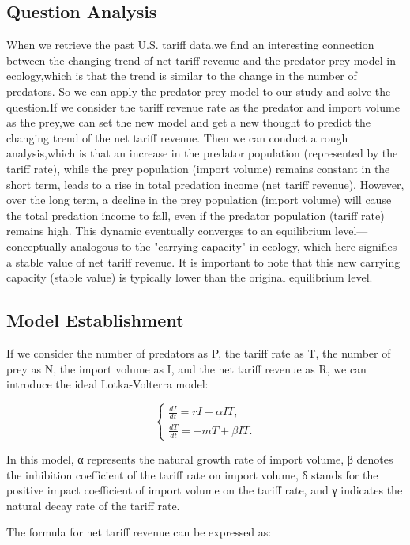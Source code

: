 \documentclass{apmcmthesis}
\begin{document}
\subsection{Question Analysis}
When we retrieve the past U.S. tariff data,we find an interesting connection between the changing trend of net tariff revenue and the predator-prey model in ecology,which is that the trend is similar to the change in the number of predators.
So we can apply the predator-prey model to our study and solve the question.If we consider the tariff revenue rate as the predator and import volume as the prey,we can set the new model and get a new thought to predict the changing trend of the net tariff revenue.
Then we can conduct a rough analysis,which is that an increase in the predator population (represented by the tariff rate), while the prey population (import volume) remains constant in the short term, leads to a rise in total predation income (net tariff revenue). However, over the long term, a decline in the prey population (import volume) will cause the total predation income to fall, even if the predator population (tariff rate) remains high. This dynamic eventually converges to an equilibrium level—conceptually analogous to the "carrying capacity" in ecology, which here signifies a stable value of net tariff revenue. It is important to note that this new carrying capacity (stable value) is typically lower than the original equilibrium level.


\subsection{Model Establishment}
If we consider the number of predators as P, the tariff rate as T, the number of prey as N, the import volume as I, and the net tariff revenue as R, we can introduce the ideal Lotka-Volterra model:

\[
\begin{cases}
\displaystyle \frac{dI}{dt} = r I - \alpha I T, \\[8pt]
\displaystyle \frac{dT}{dt} = - m T + \beta I T.
\end{cases}
\]

In this model, α  represents the natural growth rate of import volume,  β denotes the inhibition coefficient of the tariff rate on import volume, δ stands for the positive impact coefficient of import volume on the tariff rate, and γ indicates the natural decay rate of the tariff rate.

The formula for net tariff revenue can be expressed as:
\end{document}
